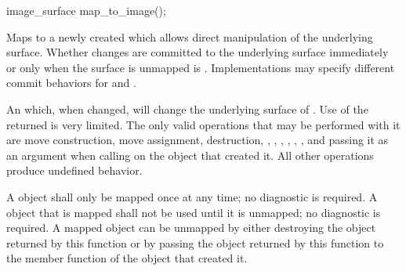 %
%
\begin{itemdecl}
image_surface map_to_image();
\end{itemdecl}
\begin{itemdescr}
	\pnum
	\effects
	Maps  to a newly created  which allows direct manipulation of the underlying surface. Whether changes are committed to the underlying surface immediately or only when the surface is unmapped is . Implementations may specify different commit behaviors for  and .
	
	\pnum
	\returns
	An  which, when changed, will change the underlying surface of .
	\enternote
	Use of the returned  is very limited. The only valid operations that may be performed with it are move construction, move assignment, destruction, , , , , , , and passing it as an argument when calling  on the  object that created it. All other operations produce undefined behavior.
	\exitnote
	
	\pnum
	\remarks
	A  object shall only be mapped once at any time; no diagnostic is required. A  object that is mapped shall not be used until it is unmapped; no diagnostic is required. A mapped  object can be unmapped by either destroying the  object returned by this function or by passing the  object returned by this function to the  member function of the  object that created it.
\end{itemdescr}

